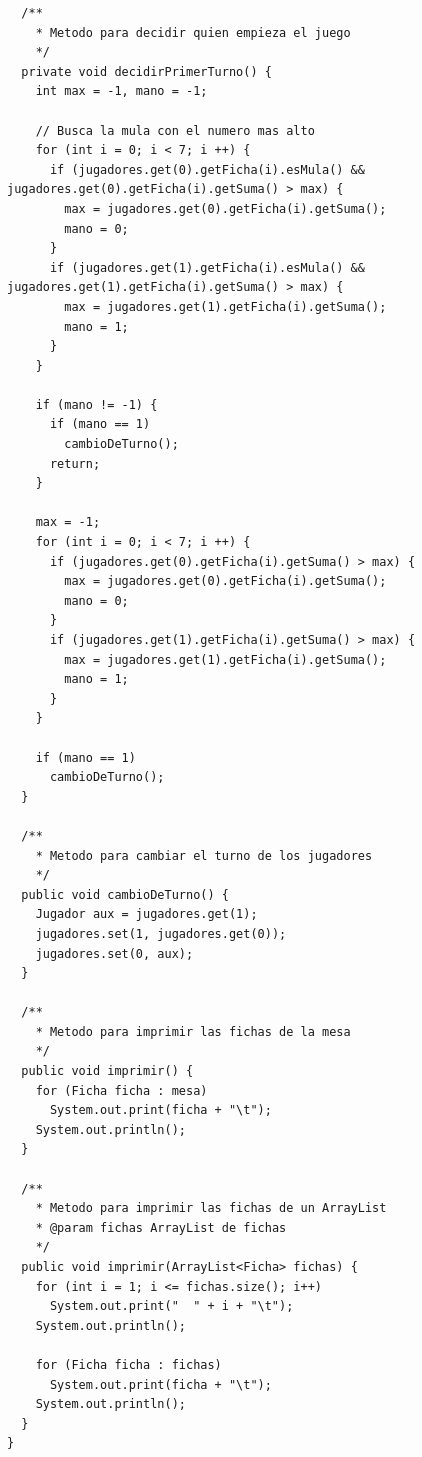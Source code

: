 \documentclass[12pt]{article}
\begin{document}
\begin{lstlisting}
  /**
    * Metodo para decidir quien empieza el juego
    */
  private void decidirPrimerTurno() {
    int max = -1, mano = -1;

    // Busca la mula con el numero mas alto
    for (int i = 0; i < 7; i ++) { 
      if (jugadores.get(0).getFicha(i).esMula() && jugadores.get(0).getFicha(i).getSuma() > max) {
        max = jugadores.get(0).getFicha(i).getSuma();
        mano = 0;
      }
      if (jugadores.get(1).getFicha(i).esMula() && jugadores.get(1).getFicha(i).getSuma() > max) {
        max = jugadores.get(1).getFicha(i).getSuma();
        mano = 1;
      }
    }

    if (mano != -1) {
      if (mano == 1)
        cambioDeTurno();
      return;
    }
    
    max = -1;
    for (int i = 0; i < 7; i ++) {
      if (jugadores.get(0).getFicha(i).getSuma() > max) {
        max = jugadores.get(0).getFicha(i).getSuma();
        mano = 0;
      }
      if (jugadores.get(1).getFicha(i).getSuma() > max) {
        max = jugadores.get(1).getFicha(i).getSuma();
        mano = 1;
      }
    }

    if (mano == 1)
      cambioDeTurno();
  }

  /**
    * Metodo para cambiar el turno de los jugadores
    */
  public void cambioDeTurno() {
    Jugador aux = jugadores.get(1);
    jugadores.set(1, jugadores.get(0));
    jugadores.set(0, aux);
  }

  /**
    * Metodo para imprimir las fichas de la mesa
    */
  public void imprimir() {
    for (Ficha ficha : mesa)
      System.out.print(ficha + "\t");
    System.out.println();
  }

  /**
    * Metodo para imprimir las fichas de un ArrayList
    * @param fichas ArrayList de fichas
    */
  public void imprimir(ArrayList<Ficha> fichas) {
    for (int i = 1; i <= fichas.size(); i++)
      System.out.print("  " + i + "\t");
    System.out.println();

    for (Ficha ficha : fichas)
      System.out.print(ficha + "\t");
    System.out.println();
  }    
}
  \end{lstlisting}
\end{document}
